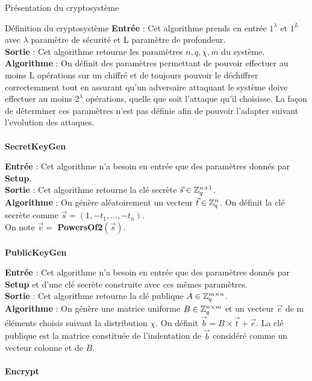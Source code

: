 \begin{section}{Présentation du cryptosystème}
\begin{subsection}{Définition du cryptosystème}
	\textbf{Entrée} : Cet algorithme prends en entrée $1^\lambda$ et $1^L$ avec $\lambda$ paramètre de sécurité et L paramètre de profondeur. \\
	\textbf{Sortie} : Cet algorithme retourne les paramètres $n, q, \chi, m$ du système. \\
	\textbf{Algorithme} : On définit des paramètres permettant de pouvoir effectuer au moins L opérations sur un chiffré et de toujours pouvoir le déchiffrer correctemment tout en assurant qu'un adversaire attaquant le système doive effectuer au moins $2^\lambda$ opérations, quelle que soit l'attaque qu'il choisisse. La façon de déterminer ces paramètres n'est pas définie afin de pouvoir l'adapter suivant l'evolution des attaques. \\
	
	\paragraph{}
	\textbf{SecretKeyGen}
	\flushleft
	
	\textbf{Entrée} : Cet algorithme n'a besoin en entrée que des paramètres donnés par \textbf{Setup}. \\
	\textbf{Sortie} : Cet algorithme retourne la clé secrète $\vec{s} \in \mathbb{Z}_q^{n+1}$. \\
	\textbf{Algorithme} : On génère aléatoirement un vecteur $\vec{t} \in \mathbb{Z}_q^n$. On définit la clé secrète comme $\vec{s} = (1, -t_1, ..., -t_n)$. \\
	On note $\vec{v} = $ \textbf{PowersOf2}$(\vec{s})$.
	
	\paragraph{}
	\textbf{PublicKeyGen}
	\flushleft
	
	\textbf{Entrée} : Cet algorithme n'a besoin en entrée que des paramètres donnés par \textbf{Setup} et d'une clé secrète construite avec ces mêmes paramètres. \\
	\textbf{Sortie} : Cet algorithme retourne la clé publique $A \in \mathbb{Z}_q^{m \times n}$.\\
	\textbf{Algorithme} : On génère une matrice uniforme $B \in \mathbb{Z}_q^{n \times m}$ et un vecteur $\vec{e}$ de m éléments choisis suivant la distribution $\chi$. On définit $\vec{b} = B \times \vec{t} + \vec{e}$. La clé publique est la matrice constituée de l'indentation de $\vec{b}$ considéré comme un vecteur colonne et de $B$.
	
	\paragraph{}
	\textbf{Encrypt}
	\flushleft
	

\end{subsection}
\end{section}
